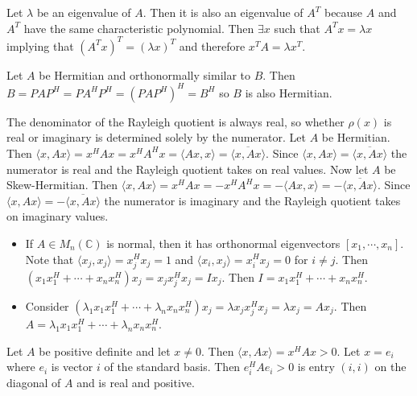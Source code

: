 \documentclass[12pt]{article}
\newenvironment{problem}[2][Problem]{\begin{trivlist}
\item[\hskip \labelsep {\bfseries #1}\hskip \labelsep {\bfseries #2}]}{\end{trivlist}}
\begin{document}
\begin{problem}{18.} 
Let $\lambda$ be an eigenvalue of $A$. Then it is also an eigenvalue of $A^T$ because $A$ and $A^T$ have the same characteristic polynomial. Then $\exists x$ such that $A^Tx = \lambda x$ implying that  $(A^Tx)^T = (\lambda x)^T$ and therefore $x^T A= \lambda x^T$. 
\end{problem}

\begin{problem}{20.} 
Let $A$ be Hermitian and orthonormally similar to $B$. Then $B = PAP^H = PA^HP^H = (PAP^H)^H = B^H$ so $B$ is also Hermitian. 
\end{problem}

\begin{problem}{24.} 
The denominator of the Rayleigh quotient is always real, so whether $\rho(x)$ is real or imaginary is determined solely by the numerator. 
Let $A$ be Hermitian. Then $\langle x, Ax \rangle = x^HAx = x^HA^Hx = \langle Ax, x \rangle = \overline{ \langle x, Ax \rangle}$. Since $\langle x, Ax \rangle = \overline{ \langle x, Ax \rangle}$ the numerator is real and the Rayleigh quotient takes on real values. Now let $A$ be Skew-Hermitian. Then $\langle x, Ax \rangle = x^HAx = -x^HA^Hx = - \langle Ax, x \rangle =  - \overline{ \langle x, Ax \rangle}$. Since $\langle x, Ax \rangle = - \overline{ \langle x, Ax \rangle}$ the numerator is imaginary and the Rayleigh quotient takes on imaginary values.
\end{problem}

\begin{problem}{25.}\hfill
\begin{itemize}
\item [(i)] If $A \in M_n(\mathbb{C})$ is normal, then it has orthonormal eigenvectors $[x_1,\cdots,x_n]$. Note that $\langle x_j, x_j \rangle =x_j^Hx_j = 1$ and $\langle x_i, x_j \rangle = x_i^Hx_j = 0$ for $i\neq j$. Then $(x_1x_1^H + \cdots + x_nx_n^H)x_j = x_jx_j^Hx_j = I x_j$. Then $I = x_1x_1^H + \cdots + x_nx_n^H$. 
\item [(ii)] Consider $(\lambda_1x_1x_1^H + \cdots + \lambda_nx_nx_n^H)x_j = \lambda x_j x_j^H x_j  = \lambda x_j = Ax_j$. Then $A = \lambda_1x_1x_1^H + \cdots + \lambda_nx_nx_n^H$. 
\end{itemize}
\end{problem}

\begin{problem}{27.} 
Let $A$ be positive definite and let $x \neq 0$. Then  $\langle x, Ax \rangle = x^HAx > 0$. Let $x = e_i$ where $e_i$ is vector $i$ of the standard basis. Then $e_i^HAe_i > 0$ is entry $(i,i)$ on the diagonal of $A$ and is real and positive. 
\end{problem}
\end{document}
